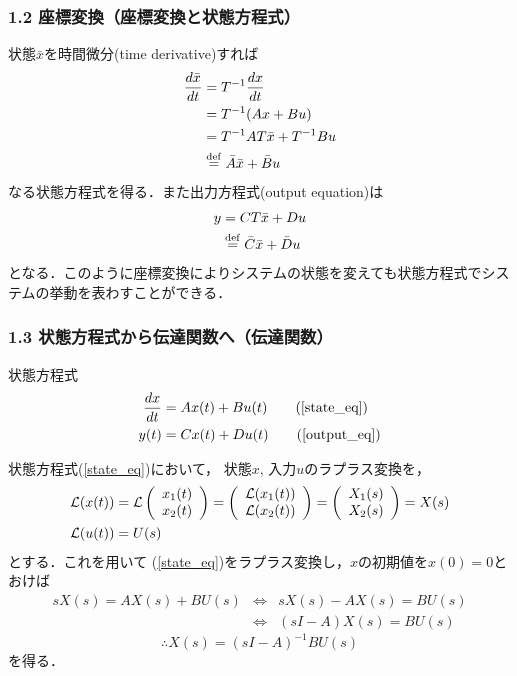 \begin{frame}[t]
\frametitle{1.2 座標変換（座標変換と状態方程式）}
状態$\bar{x}$を時間微分(time derivative)すれば
\begin{align}
 \frac{d \bar{x}}{dt} &= T^{-1} \frac{dx}{dt} \nonumber \\
 &= T^{-1} ( A x + B u) \nonumber \\
 &= T^{-1} A T \bar{x} + T^{-1} B u \nonumber \\
 & \stackrel{\rm def}{=} \bar{A} \bar{x} + \bar{B} u
\label{eq:anotherstate_st}
\end{align}
なる状態方程式を得る．また出力方程式(output equation)は
\begin{align}
 y &= C T \bar{x} + D u \nonumber \\
   & \stackrel{\rm def}{=} \bar{C} \bar{x} + \bar{D} u
\label{eq:anotherstate_out}
\end{align}
となる．このように座標変換によりシステムの状態を変えても状態方程式でシス
テムの挙動を表わすことができる．
\end{frame}

\begin{frame}[t]
\frametitle{1.3 状態方程式から伝達関数へ（伝達関数）}
状態方程式
\begin{align}
 \frac{dx}{dt} &= A x(t) + B u(t) \tag{\ref{state_eq}} \\
 y(t) &= C x(t) + D u(t) \tag{\ref{output_eq}}
\end{align}

状態方程式(\ref{state_eq})において，
状態$x$, 入力$u$のラプラス変換を，
\begin{align}
 {\cal L}(x(t)) &=
 {\cal L} \left(
        \begin{array}{c}
	 x_1(t) \\
	 x_2(t)
	\end{array}
	\right) =
 \left(
 \begin{array}{c}
  {\cal L}(x_1(t)) \\
  {\cal L}(x_2(t))
 \end{array}
 \right) =
 \left(
 \begin{array}{c}
  X_1(s) \\
  X_2(s)
 \end{array}
 \right) = X(s) \\
 {\cal L}(u(t)) &= U(s)
\end{align}
とする．これを用いて
(\ref{state_eq})をラプラス変換し，$x$の初期値を$x(0) = 0$とおけば
\begin{eqnarray*}
 s X(s) = A X(s) + B U(s) & \Leftrightarrow & s X(s) - A X(s) = B U(s) \\
                          & \Leftrightarrow & (sI - A)X(s) = B U(s)
\end{eqnarray*}
\begin{equation}
 \therefore X(s) = (s I - A)^{-1} B U(s)
\end{equation}
を得る．
\end{frame}

